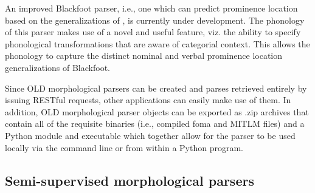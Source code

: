 \documentclass[11pt]{article}
\newcommand{\smalltodo}[2][]
    {\todo[caption={#2}, #1]
    {\tiny#2\normalsize}}
\begin{document}
An improved Blackfoot parser, i.e., one which can predict prominence location
based on the generalizations of \cite{weber2013}, is currently under
development. The phonology of this parser makes use of a novel and useful
feature, viz. the ability to specify phonological transformations that are
aware of categorial context. This allows the phonology to capture the distinct
nominal and verbal prominence location generalizations of Blackfoot.

Since OLD morphological parsers can be created and parses retrieved entirely by
issuing RESTful requests, other applications can easily make use of them. In
addition, OLD morphological parser objects can be exported as .zip archives
that contain all of the requisite binaries (i.e., compiled foma and MITLM
files) and a Python module and executable which together allow for the parser
to be used locally via the command line or from within a Python program.






\subsection{Semi-supervised morphological parsers}
 \label{sec:lingsync-glosser} 

%
\end{document}
